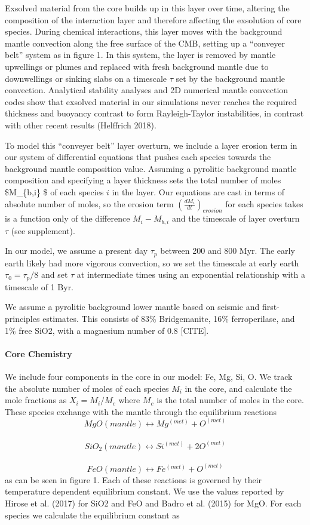 \documentclass[]{article}
\let\oldparagraph\paragraph
\renewcommand{\paragraph}[1]{\oldparagraph{#1}\mbox{}}
\begin{document}
Exsolved material from the core builds up in this layer over time,
altering the composition of the interaction layer and therefore
affecting the exsolution of core species. During chemical interactions,
this layer moves with the background mantle convection along the free
surface of the CMB, setting up a ``conveyer belt'' system as in figure
1. In this system, the layer is removed by mantle upwellings or plumes
and replaced with fresh background mantle due to downwellings or sinking
slabs on a timescale \(\tau\) set by the background mantle convection.
Analytical stability analyses and 2D numerical mantle convection codes
show that exsolved material in our simulations never reaches the
required thickness and buoyancy contrast to form Rayleigh-Taylor
instabilities, in contrast with other recent results (Helffrich 2018).

To model this ``conveyer belt'' layer overturn, we include a layer
erosion term in our system of differential equations that pushes each
species towards the background mantle composition value. Assuming a
pyrolitic background mantle composition and specifying a layer thickness
sets the total number of moles \$M\_\{b,i\} \$ of each species \(i\) in
the layer. Our equations are cast in terms of absolute number of moles,
so the erosion term \(\left(\frac{dM_i}{dt}\right)_{erosion}\) for each
species takes is a function only of the difference \(M_i - M_{b,i}\) and
the timescale of layer overturn \(\tau\) (see supplement).

In our model, we assume a present day \(\tau_p\) between 200 and 800
Myr. The early earth likely had more vigorous convection, so we set the
timescale at early earth \(\tau_0 = \tau_p/8\) and set \(\tau\) at
intermediate times using an exponential relationship with a timescale of
1 Byr.

We assume a pyrolitic background lower mantle based on seismic and
first-principles estimates. This consists of 83\% Bridgemanite, 16\%
ferroperilase, and 1\% free SiO2, with a magnesium number of 0.8
{[}CITE{]}.

\hypertarget{core-chemistry}{%
\paragraph{Core Chemistry}\label{core-chemistry}}

We include four components in the core in our model: Fe, Mg, Si, O. We
track the absolute number of moles of each species \(M_i\) in the core,
and calculate the mole fractions as \(X_i=M_i/M_c\) where \(M_c\) is the
total number of moles in the core. These species exchange with the
mantle through the equilibrium reactions ​
\[MgO (mantle) \leftrightarrow Mg^{(met)} + O^{(met)}\] ​
\[SiO_2 (mantle) \leftrightarrow Si^{(met)} +2 O^{(met)}\] ​
\[FeO (mantle) \leftrightarrow Fe^{(met)} +O^{(met)}\] as can be seen in
figure 1. Each of these reactions is governed by their temperature
dependent equilibrium constant. We use the values reported by Hirose et
al. (2017) for SiO2 and FeO and Badro et al. (2015) for MgO. For each
species we calculate the equilibrium constant as
\end{document}

